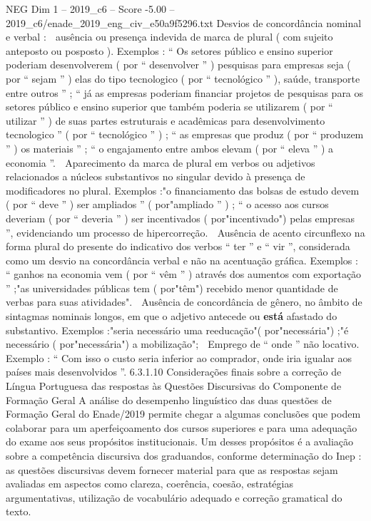 \begin{textsample}{NEG Dim 1 – 2019\_c6 – Score -5.00 – 2019\_c6/enade\_2019\_eng\_civ\_e50a9f5296.txt}
Desvios de concordância nominal e verbal :  ausência ou presença indevida de marca de plural ( com sujeito anteposto ou posposto ).
Exemplos : “ Os setores público e ensino superior poderiam desenvolverem ( por “ desenvolver ” ) pesquisas para empresas seja ( por “ sejam ” ) elas do tipo tecnologico ( por “ tecnológico ” ), saúde, transporte entre outros ” ; “ já as empresas poderiam financiar projetos de pesquisas para os setores público e ensino superior que também poderia se utilizarem ( por “ utilizar ” ) de suas partes estruturais e acadêmicas para desenvolvimento tecnologico ” ( por “ tecnológico ” ) ; “ as empresas que produz ( por “ produzem ” ) os materiais ” ; “ o engajamento entre ambos elevam ( por “ eleva ” ) a economia ”.  Aparecimento da marca de plural em verbos ou adjetivos relacionados a núcleos substantivos no singular devido à presença de modificadores no plural.
Exemplos :"o financiamento das bolsas de estudo devem ( por “ deve ” ) ser ampliados ” ( por"ampliado ” ) ; “ o acesso aos cursos deveriam ( por “ deveria ” ) ser incentivados ( por"incentivado") pelas empresas ”, evidenciando um processo de hipercorreção.  Ausência de acento circunflexo na forma plural do presente do indicativo dos verbos “ ter ” e “ vir ”, considerada como um desvio na concordância verbal e não na acentuação gráfica.
Exemplos : “ ganhos na economia vem ( por “ vêm ” ) através dos aumentos com exportação ” ;"as universidades públicas tem ( por"têm") recebido menor quantidade de verbas para suas atividades".  Ausência de concordância de gênero, no âmbito de sintagmas nominais longos, em que o adjetivo antecede ou \textbf{está} afastado do substantivo.
Exemplos :"seria necessário uma reeducação"( por"necessária") ;"é necessário ( por"necessária") a mobilização";  Emprego de “ onde ” não locativo.
Exemplo : “ Com isso o custo seria inferior ao comprador, onde iria igualar aos países mais desenvolvidos ”. 6.3.1.10 Considerações finais sobre a correção de Língua Portuguesa das respostas às Questões Discursivas do Componente de Formação Geral A análise do desempenho linguístico das duas questões de Formação Geral do Enade/2019 permite chegar a algumas conclusões que podem colaborar para um aperfeiçoamento dos cursos superiores e para uma adequação do exame aos seus propósitos institucionais.
Um desses propósitos é a avaliação sobre a competência discursiva dos graduandos, conforme determinação do Inep : as questões discursivas devem fornecer material para que as respostas sejam avaliadas em aspectos como clareza, coerência, coesão, estratégias argumentativas, utilização de vocabulário adequado e correção gramatical do texto.

\end{textsample}
